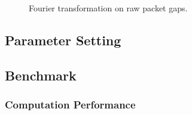 \begin{figure}[htpb]
   \centering
   \quad
   \caption{Fourier transformation on raw packet gaps.}
   \label{fig:fft}
\end{figure}

\subsection{Parameter Setting}
\label{sub:parameter_setting}



\subsection{Benchmark}
\label{sub:benchmark}

\subsubsection{Computation Performance}
\label{ssub:computation_performance}



